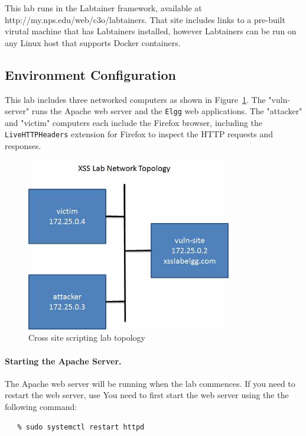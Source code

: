 
This lab runs in the Labtainer framework,
available at http://my.nps.edu/web/c3o/labtainers.
That site includes links to a pre-built virutal machine
that has Labtainers installed, however Labtainers can
be run on any Linux host that supports Docker containers.


\subsection{Environment Configuration}
This lab includes three networked computers as shown in 
Figure~\ref{fig:topology}. 
The "vuln-server" runs the Apache web server and the {\tt Elgg} web
applications.  The "attacker" and "victim" computers each include
the Firefox browser, including the \texttt{LiveHTTPHeaders} extension for Firefox to
inspect the HTTP requests and responses. 

\begin{figure}[htb]
\begin{center}
\includegraphics [width=0.8\textwidth,natwidth=621,natheight=403]{xsite.jpg}
\end{center}
\caption{Cross site scripting lab topology}
\label{fig:topology}
\end{figure}


\paragraph{Starting the Apache Server.}
The Apache web server will be running when the lab
commences.  If you need to restart the web server, use
You need to first start the web server using the
the following command:
\begin{verbatim}
   % sudo systemctl restart httpd
\end{verbatim}


